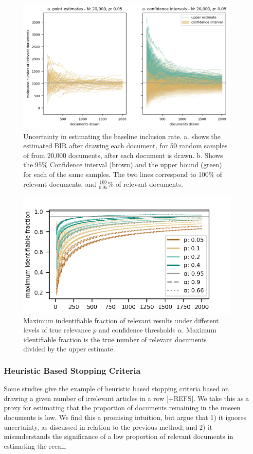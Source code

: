 \documentclass{bmcart}
\begin{document}
	\begin{figure}
	\includegraphics[width=\linewidth]{../images/bir_sampling.png}
	\caption{Uncertainty in estimating the baseline inclusion rate. a. shows the estimated BIR after drawing each document, for 50 random samples of from 20,000 documents, after each document is drawn. b. Shows the 95\% Confidence interval (brown) and the upper bound (green) for each of the same samples. The two lines correspond to 100\% of relevant documents, and $\frac{100}{0.95}$\% of relevant documents.}
	\label{bir-sampling}
\end{figure}

\begin{figure}
	\includegraphics[width=0.5\linewidth]{../images/bir_variation.png}
	\caption{Maximum indentifiable fraction of relevant results under different levels of true relevance $p$ and confidence thresholds $\alpha$. Maximum identifiable fraction is the true number of relevant documents divided by the upper estimate.}
	\label{bir-variation}
\end{figure}

		
\subsubsection*{Heuristic Based Stopping Criteria}

Some studies give the example of heuristic based stopping criteria based on drawing a given number of irrelevant articles in a row \cite{Przybya2018} [+REFS]. 
We take this as a proxy for estimating that the proportion of documents remaining in the unseen documents is low. 
We find this a promising intuition, but argue that 1) it ignores uncertainty, as discussed in relation to the previous method; and 2) it misunderstands the significance of a low proportion of relevant documents in estimating the recall.
\end{document}
